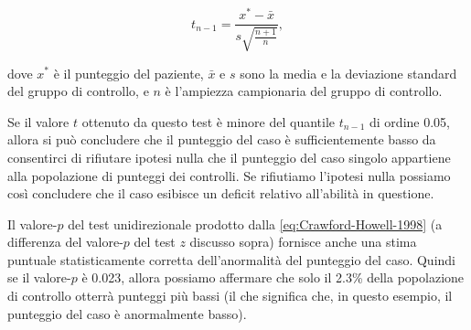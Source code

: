 \documentclass[
  11pt,
]{krantz}
\theoremstyle{definition}
\theoremstyle{definition}
\theoremstyle{definition}
\theoremstyle{definition}
\theoremstyle{remark}
\begin{document}
\[
t_{n-1} = \frac{x^* - \bar{x}}{s \sqrt{\frac{n+1}{n}}},
\label{eq:Crawford-Howell-1998}
\]

dove \(x^*\) è il punteggio del paziente, \(\bar{x}\) e \(s\) sono la media e la deviazione standard del gruppo di controllo, e \(n\) è l'ampiezza campionaria del gruppo di controllo.

Se il valore \(t\) ottenuto da questo test è minore del quantile \(t_{n-1}\) di ordine 0.05, allora si può concludere che il punteggio del caso è sufficientemente basso da consentirci di rifiutare ipotesi nulla che il punteggio del caso singolo appartiene alla popolazione di punteggi dei controlli. Se rifiutiamo l'ipotesi nulla possiamo così concludere che il caso esibisce un deficit relativo all'abilità in questione.

Il valore-\(p\) del test unidirezionale prodotto dalla \eqref{eq:Crawford-Howell-1998} (a differenza del valore-\(p\) del test \(z\) discusso sopra) fornisce anche una stima puntuale statisticamente corretta dell'anormalità del punteggio del caso. Quindi se il valore-\(p\) è 0.023, allora possiamo affermare che solo il 2.3\% della popolazione di controllo otterrà punteggi più bassi (il che significa che, in questo esempio, il punteggio del caso è anormalmente basso).
\end{document}
